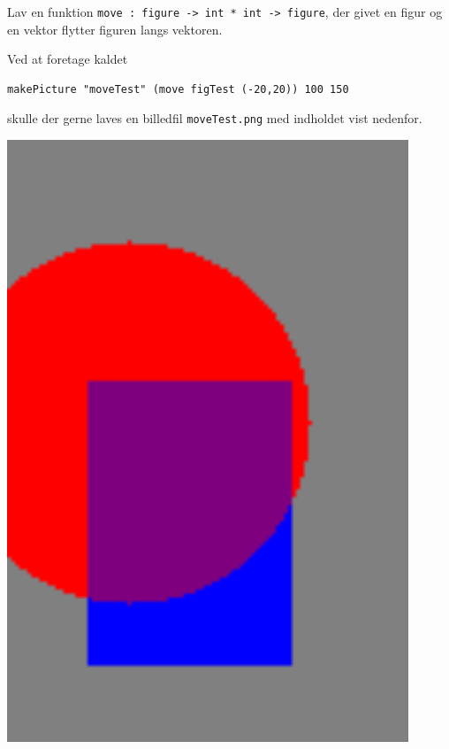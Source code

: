 Lav en funktion \lstinline{move : figure -> int * int -> figure}, der
givet en figur og en vektor flytter figuren langs vektoren.

Ved at foretage kaldet
\begin{verbatim}
makePicture "moveTest" (move figTest (-20,20)) 100 150
\end{verbatim}
skulle der gerne laves en billedfil \lstinline{moveTest.png} med
indholdet vist nedenfor.
\begin{center}
  \begin{minipage}{.2\textwidth}
    \includegraphics[width=0.9\textwidth]{moveTest.png}
  \end{minipage}
\end{center}
  